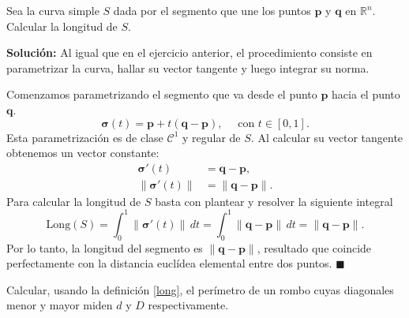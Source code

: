     
\begin{example}\label{ejer:param_seg}
  Sea la curva simple $S$ dada por el segmento que une los puntos $\mathbf{p}$ y $\mathbf{q}$ en $\mathbb{R}^n$. Calcular la longitud de $S$. 
\end{example}
    
\noindent\textbf{Solución:} Al igual que en el ejercicio anterior, el procedimiento consiste en parametrizar la curva, hallar su vector tangente y luego integrar su norma. 

Comenzamos parametrizando el segmento que va desde el punto $\mathbf{p}$ hacia el punto $\mathbf{q}$.  
\[ 
\boldsymbol{\sigma}(t) = \mathbf{p} + t(\mathbf{q} - \mathbf{p}), \quad  \text{ con } t\in [0,1]. 
\]
Esta parametrización es de clase $\mathcal{C}^1$ y regular de $S$.  Al calcular su vector tangente obtenemos un vector constante:
\begin{align*} 
\boldsymbol{\sigma}'(t) &=\mathbf{q} - \mathbf{p}, \\[0.2cm]
\|\boldsymbol{\sigma}'(t)\| &=   \|\mathbf{q} - \mathbf{p}\|. 
\end{align*} 
Para calcular la longitud de $S$  basta con plantear y resolver la siguiente integral
\[ 
\text{Long}(S) = \int_{0}^{1} \bigl\|\boldsymbol{\sigma}'(t)\bigr\| \, dt = \int_{0}^{1} \|\mathbf{q} - \mathbf{p}\| \, dt = \|\mathbf{q} - \mathbf{p}\|.
\] 
Por lo tanto, la longitud del segmento es $\|\mathbf{q} - \mathbf{p}\|$, resultado que coincide perfectamente con la distancia euclídea elemental entre dos puntos.  \hfill $\blacksquare$ 


\begin{tarea} Calcular, usando la definici\'on  \ref{long},   el per\'imetro de un rombo cuyas diagonales menor y mayor miden $d$ y $D$ respectivamente.  
 \end{tarea}
